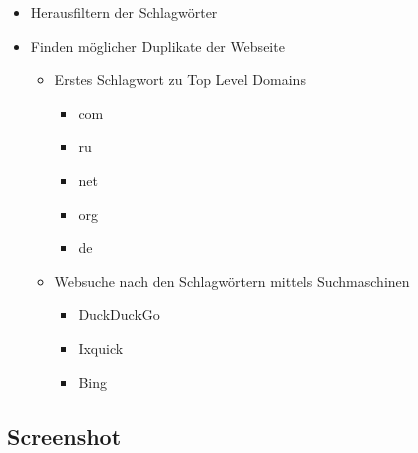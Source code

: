 \begin{itemize}
  \item Herausfiltern der Schlagwörter
  \item Finden möglicher Duplikate der Webseite
  \begin{itemize}
    \item Erstes Schlagwort zu Top Level Domains
    \begin{itemize}
      \item com
      \item ru
      \item net
      \item org
      \item de
    \end{itemize}
    \item Websuche nach den Schlagwörtern mittels Suchmaschinen
    \begin{itemize}
      \item DuckDuckGo
      \item Ixquick
      \item Bing
    \end{itemize}
  \end{itemize}
\end{itemize}

\subsection{Screenshot}
